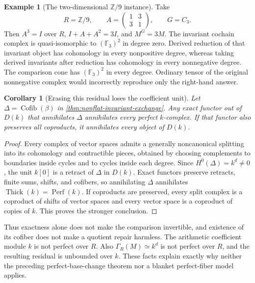 \documentclass[11pt]{article}
\newtheorem{corollary}[theorem]{Corollary}
\theoremstyle{definition}
\newtheorem{example}[theorem]{Example}
\theoremstyle{remark}
\newcommand{\Cofib}{\operatorname{Cofib}}
\begin{document}
\begin{example}[The two-dimensional $\mathbb Z/9$ instance]\label{ex:nine-invariants}
Take
\[
 R=\mathbb Z/9,\qquad
 A=\begin{pmatrix}1&3\\3&1\end{pmatrix},\qquad G=C_3.
\]
Then $A^3=I$ over $R$, $I+A+A^2=3I$, and $M^G=3M$. The invariant cochain complex is quasi-isomorphic to $(\mathbb F_3)^2$ in degree zero. Derived reduction of that invariant object has cohomology in every nonpositive degree, whereas taking derived invariants after reduction has cohomology in every nonnegative degree. The comparison cone has $(\mathbb F_3)^2$ in every degree. Ordinary tensor of the original nonnegative complex would incorrectly reproduce only the right-hand answer.
\end{example}

\begin{corollary}[Erasing this residual loses the coefficient unit]\label{cor:intrinsic-unit-loss}
Let $\Delta=\Cofib(\beta)$ in \cref{thm:nonflat-invariant-exchange}. Any exact functor out of $D(k)$ that annihilates $\Delta$ annihilates every perfect $k$-complex. If that functor also preserves all coproducts, it annihilates every object of $D(k)$.
\end{corollary}
\begin{proof}
Every complex of vector spaces admits a generally noncanonical splitting into its cohomology and contractible pieces, obtained by choosing complements to boundaries inside cycles and to cycles inside each degree. Since $H^0(\Delta)=k^d\ne0$, the unit $k[0]$ is a retract of $\Delta$ in $D(k)$. Exact functors preserve retracts, finite sums, shifts, and cofibers, so annihilating $\Delta$ annihilates $\operatorname{Thick}(k)=\operatorname{Perf}(k)$. If coproducts are preserved, every split complex is a coproduct of shifts of vector spaces and every vector space is a coproduct of copies of $k$. This proves the stronger conclusion.
\end{proof}

Thus exactness alone does not make the comparison invertible, and existence of its cofiber does not make a quotient repair harmless. The arithmetic coefficient module $k$ is not perfect over $R$. Also $\Gamma_R(M)\simeq k^d$ is not perfect over $R$, and the resulting residual is unbounded over $k$. These facts explain exactly why neither the preceding perfect-base-change theorem nor a blanket perfect-fiber model applies.
\end{document}
